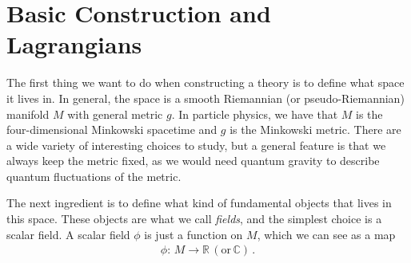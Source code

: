 \section{Basic Construction and Lagrangians}

\medskip
The first thing we want to do when constructing a theory is to define what space it lives in. In general, the space is a smooth Riemannian (or pseudo-Riemannian) manifold $M$ with general metric $g$. In particle physics, we have that $M$ is the four-dimensional Minkowski spacetime and $g$ is the Minkowski metric. There are a wide variety of interesting choices to study, but a general feature is that we always keep the metric fixed, as we would need quantum gravity to describe quantum fluctuations of the metric.

The next ingredient is to define what kind of fundamental objects that lives in this space. These objects are what we call \emph{fields}, and the simplest choice is a scalar field. A scalar field $\phi$ is just a function on $M$, which we can see as a map
\begin{align}
    \phi:\,M\rightarrow \mathbb{R}\, (\text{or}\,\mathbb{C})\,.
\end{align}

